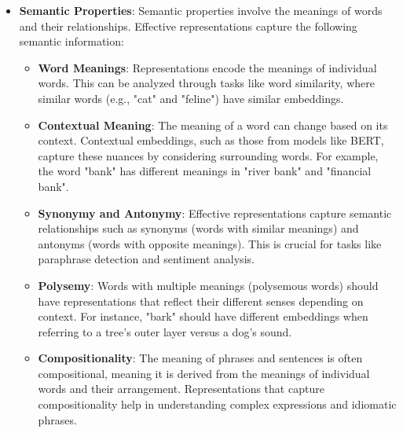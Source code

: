 \begin{itemize}
    \item \textbf{Semantic Properties}: Semantic properties involve the meanings of words and their relationships. Effective representations capture the following semantic information:
    \begin{itemize}
        \item \textbf{Word Meanings}: Representations encode the meanings of individual words. This can be analyzed through tasks like word similarity, where similar words (e.g., "cat" and "feline") have similar embeddings.
        \item \textbf{Contextual Meaning}: The meaning of a word can change based on its context. Contextual embeddings, such as those from models like BERT, capture these nuances by considering surrounding words. For example, the word "bank" has different meanings in "river bank" and "financial bank".
        \item \textbf{Synonymy and Antonymy}: Effective representations capture semantic relationships such as synonyms (words with similar meanings) and antonyms (words with opposite meanings). This is crucial for tasks like paraphrase detection and sentiment analysis.
        \item \textbf{Polysemy}: Words with multiple meanings (polysemous words) should have representations that reflect their different senses depending on context. For instance, "bark" should have different embeddings when referring to a tree's outer layer versus a dog's sound.
        \item \textbf{Compositionality}: The meaning of phrases and sentences is often compositional, meaning it is derived from the meanings of individual words and their arrangement. Representations that capture compositionality help in understanding complex expressions and idiomatic phrases.
    \end{itemize}
\end{itemize}

